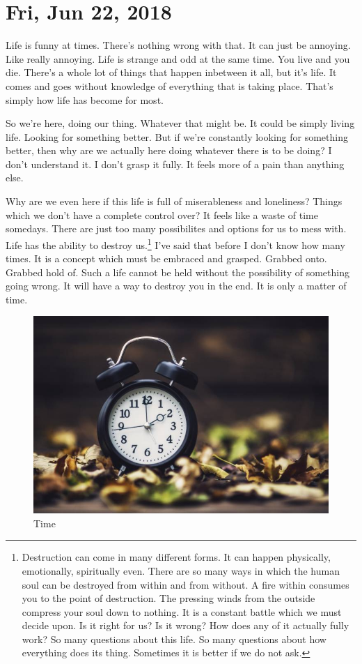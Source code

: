 \section{Fri, Jun 22, 2018}

Life is funny at times. There's nothing wrong with that. It can just be
annoying. Like really annoying. Life is strange and odd at the same time. You
live and you die. There's a whole lot of things that happen inbetween it all,
but it's life. It comes and goes without knowledge of everything that is taking
place. That's simply how life has become for most.

So we're here, doing our thing. Whatever that might be. It could be simply
living life. Looking for something better. But if we're constantly looking for
something better, then why are we actually here doing whatever there is to be
doing? I don't understand it. I don't grasp it fully. It feels more of a pain
than anything else.

Why are we even here if this life is full of miserableness and loneliness?
Things which we don't have a complete control over? It feels like a waste of
time somedays. There are just too many possibilites and options for us to mess
with. Life has the ability to destroy us.\footnote{
Destruction can come in many different forms. It can happen physically,
emotionally, spiritually even. There are so many ways in which the human soul
can be destroyed from within and from without. A fire within consumes you to the
point of destruction. The pressing winds from the outside compress your soul
down to nothing. It is a constant battle which we must decide upon. Is it right
for us? Is it wrong? How does any of it actually fully work? So many questions
about this life. So many questions about how everything does its thing.
Sometimes it is better if we do not ask.
} I've said that before I don't know how many times. It is a concept which must
be embraced and grasped. Grabbed onto. Grabbed hold of. Such a life cannot be
held without the possibility of something going wrong. It will have a way to
destroy you in the end. It is only a matter of time.

\begin{figure}[h!]
  \centering
  \includegraphics[width=0.2\linewidth]{2018/images/time.jpg}
  \caption{Time}
  \label{fig:time}
\end{figure}


